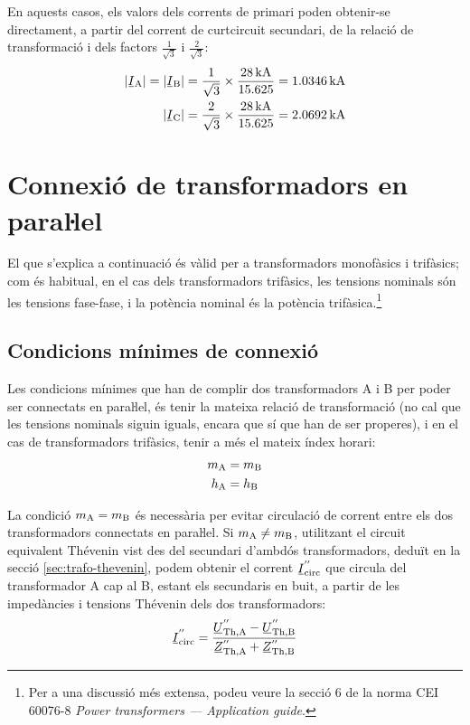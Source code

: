 \begin{exemple}[\CCasimSecTrafo{}]
     En aquests casos, els valors dels corrents de primari poden obtenir-se directament, a partir del corrent de curtcircuit secundari, de la relació de transformació i dels factors $\frac{1}{\sqrt{3}}$ i  $\frac{2}{\sqrt{3}}$:
    \begin{align*}
        |\cmplx{I}\ped{A}| = |\cmplx{I}\ped{B}| = \frac{1}{\sqrt{3}} \times \frac{\qty{28}{kA}}{\num{15,625}} = \qty{1,0346}{kA} \\
        |\cmplx{I}\ped{C}|= \frac{2}{\sqrt{3}} \times \frac{\qty{28}{kA}}{\num{15,625}} = \qty{2,0692}{kA}
    \end{align*}

\end{exemple}



\section{Connexió de transformadors en paraŀlel}

El que s'explica a continuació és vàlid per a transformadors
monofàsics i trifàsics; com és habitual, en el cas dels
transformadors trifàsics, les tensions nominals són les tensions
fase-fase, i la potència nominal és la potència trifàsica.\footnote{Per a una discussió més extensa,  podeu veure la secció 6 de la norma CEI 60076-8 \emph{Power transformers --- Application guide}.}

\subsection{Condicions mínimes de connexió}

Les condicions mínimes que han de complir dos transformadors A i B per poder ser connectats en paraŀlel, és tenir la mateixa relació de transformació (no cal que les tensions nominals siguin iguals, encara que sí que han de ser properes), i en el cas de transformadors trifàsics, tenir a més el mateix índex horari:
\begin{align}
    m_\mathrm{A} &= m_\mathrm{B}\label{eq:connex-min-1}\\
    h_\mathrm{A} &= h_\mathrm{B}\label{eq:connex-min-2}
\end{align}

La condició $m_\mathrm{A} = m_\mathrm{B}$ és necessària per evitar circulació de corrent entre els dos transformadors connectats en paraŀlel. Si $m_\mathrm{A} \neq m_\mathrm{B}$, utilitzant el circuit equivalent  Thévenin vist des del secundari d'ambdós transformadors, deduït en la secció \vref{sec:trafo-thevenin}, podem obtenir el corrent $\cmplx{I}\ped{circ}^{''}$ que circula del transformador A cap al B, estant els secundaris en buit, a partir de les impedàncies i tensions Thévenin dels dos transformadors:
\begin{equation}
    \cmplx{I}\ped{circ}^{''} = \frac{\cmplx{U}\ped{Th,A}^{''}-\cmplx{U}\ped{Th,B}^{''}}{\cmplx{Z}\ped{Th,A}^{''}+
    \cmplx{Z}\ped{Th,B}^{''}}
\end{equation}

